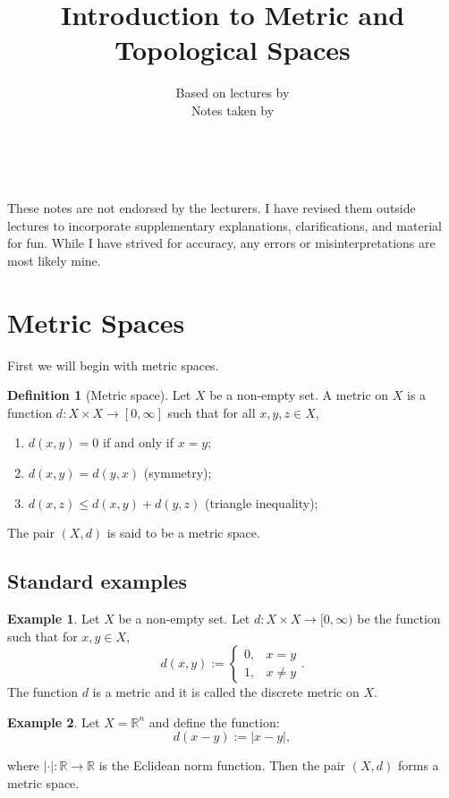 \documentclass[11pt,a4paper]{article}
\title{\textbf{Introduction to Metric and Topological Spaces}}
\author{Based on lectures by \nlecturer \\\small Notes taken by \nauthor}
\date{\nterm\ \nyear}
\makeatletter
\let\@real@maketitle\maketitle
\renewcommand{\maketitle}{\@real@maketitle\begin{center}
\begin{minipage}[c]{0.9\textwidth}\centering\footnotesize
These notes are not endorsed by the lecturers.
I have revised them outside lectures to incorporate supplementary explanations,
clarifications, and material for fun.
While I have strived for accuracy, any errors or misinterpretations 
are most likely mine.
\end{minipage}\end{center}}
\theoremstyle{definition}
\newtheorem{definition}{Definition}[section]
\newtheorem{example}{Example}[section]
\theoremstyle{plain}
\newcommand{\R}{\mathbb{R}}
\newcommand{\abs}[1]{\left\lvert #1\right\rvert}
\makeatother
\begin{document}
  \maketitle
  \vspace{5cm}
  \begin{center}
  \end{center}

  \newpage
  \tableofcontents
  \newpage
  \section{Metric Spaces}\label{sec:metric-spaces}
  First we will begin with metric spaces.
  \begin{definition}[Metric space]
  Let $X$ be a non-empty set. A metric on $X$ is a function 
  $d \colon X \times X \to [0,\infty]$ such that for all $x,y,z \in X$,
  \end{definition}
  \begin{enumerate}
    \item[(1)] $d(x,y) = 0$ if and only if $x = y$;
    \item[(2)] $d(x,y) = d(y,x)$ (symmetry);
    \item[(3)] $d(x,z) \le d(x,y) + d(y,z)$ (triangle inequality);
  \end{enumerate}
  The pair $(X,d)$ is said to be a metric space.

  \subsection{Standard examples}

  \begin{example}
  Let $X$ be a non-empty set. Let $d \colon X \times X \to [0,\infty)$ be
  the function such that for $x,y \in X$,
  \[
    d(x,y) := \begin{cases}
      0, & x=y \\
      1, & x \neq y
    \end{cases}.
  \]
  The function $d$ is a metric and it is called the discrete metric on $X$.
  \end{example}
  \begin{example}
  Let $X = \R^n$ and define the function:
  \[
    d(x - y) := \abs{x - y},
  \]

  where $\abs{\cdot} \colon \R \to \R$ is the Eclidean norm function. 
  Then the pair $(X, d)$ forms a metric space.
  \end{example}
\end{document}
